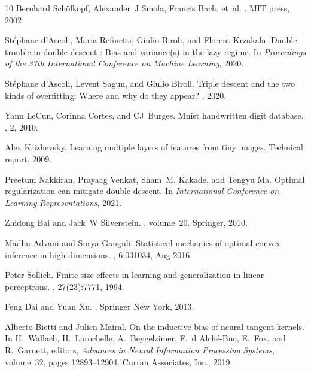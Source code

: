 \documentclass[11pt]{article}
\begin{document}
\begin{thebibliography}{10}
Bernhard Sch{\"o}lkopf, Alexander~J Smola, Francis Bach, et~al.
.
\newblock MIT press, 2002.

Stéphane d'Ascoli, Maria Refinetti, Giulio Biroli, and Florent Krzakala.
\newblock Double trouble in double descent : Bias and variance(s) in the lazy
  regime.
\newblock In {\em Proceedings of the 37th International Conference on Machine
  Learning}, 2020.

Stéphane d'Ascoli, Levent Sagun, and Giulio Biroli.
\newblock Triple descent and the two kinds of overfitting: Where and why do
  they appear?
, 2020.

Yann LeCun, Corinna Cortes, and CJ~Burges.
\newblock Mnist handwritten digit database.
,
  2, 2010.

Alex Krizhevsky.
\newblock Learning multiple layers of features from tiny images.
\newblock Technical report, 2009.

Preetum Nakkiran, Prayaag Venkat, Sham~M. Kakade, and Tengyu Ma.
\newblock Optimal regularization can mitigate double descent.
\newblock In {\em International Conference on Learning Representations}, 2021.

Zhidong Bai and Jack~W Silverstein.
,
  volume~20.
\newblock Springer, 2010.

Madhu Advani and Surya Ganguli.
\newblock Statistical mechanics of optimal convex inference in high dimensions.
, 6:031034, Aug 2016.

Peter Sollich.
\newblock Finite-size effects in learning and generalization in linear
  perceptrons.
, 27(23):7771,
  1994.

Feng Dai and Yuan Xu.
.
\newblock Springer New York, 2013.

Alberto Bietti and Julien Mairal.
\newblock On the inductive bias of neural tangent kernels.
\newblock In H.~Wallach, H.~Larochelle, A.~Beygelzimer, F.~d\textquotesingle
  Alch\'{e}-Buc, E.~Fox, and R.~Garnett, editors, {\em Advances in Neural
  Information Processing Systems}, volume~32, pages 12893--12904. Curran
  Associates, Inc., 2019.


\end{thebibliography}
\end{document}
